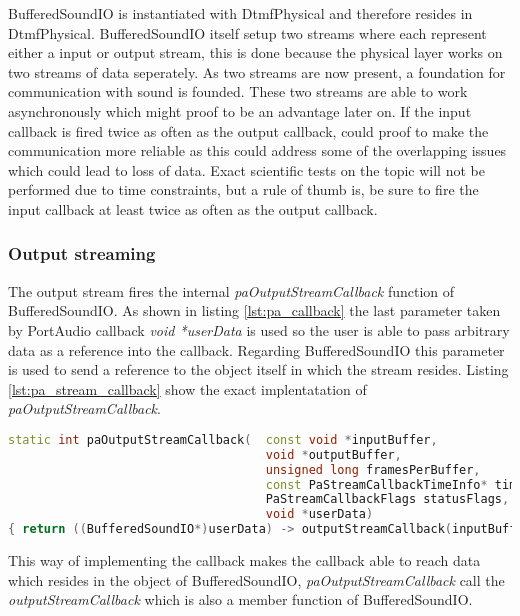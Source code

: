 	BufferedSoundIO is instantiated with DtmfPhysical and therefore resides in DtmfPhysical. BufferedSoundIO itself setup two streams where each
	represent either a input or output stream, this is done because the physical layer works on two streams of data seperately. As two streams are 
	now present, a foundation for communication with sound is founded. These two streams are able to work asynchronously which might proof to be an
	advantage later on. If the input callback is fired twice as often as the output callback, could proof to make the communication more reliable
	as this could address some of the overlapping issues which could lead to loss of data. Exact scientific tests on the topic will not be performed
	due to time constraints, but a rule of thumb is, be sure to fire the input callback at least twice as often as the output callback.
	
		\subsubsection{Output streaming}
		The output stream fires the internal \textit{paOutputStreamCallback} function of BufferedSoundIO. As shown in listing \ref{lst:pa_callback}
		the last parameter taken by PortAudio callback \textit{void *userData} is used so the user is able to pass arbitrary data as a reference into the
		callback. Regarding BufferedSoundIO this parameter is used to send a reference to the object itself in which the stream resides. 
		Listing \ref{lst:pa_stream_callback} show the exact implentatation of \textit{paOutputStreamCallback}.
		
		\begin{lstlisting}[float=htb,language={C++},caption={Implementation of \textit{paOutputStreamCallback}.}]
static int paOutputStreamCallback(	const void *inputBuffer,
									void *outputBuffer,
									unsigned long framesPerBuffer,
									const PaStreamCallbackTimeInfo* timeInfo,
									PaStreamCallbackFlags statusFlags,
									void *userData)
{ return ((BufferedSoundIO*)userData) -> outputStreamCallback(inputBuffer, outputBuffer, framesPerBuffer, timeInfo, statusFlags); }
		\end{lstlisting}\label{lst:pa_stream_callback}
		
		This way of implementing the callback makes the callback able to reach data which resides in the object of BufferedSoundIO,
		\textit{paOutputStreamCallback} call the \textit{outputStreamCallback} which is also a member function of BufferedSoundIO.
		
